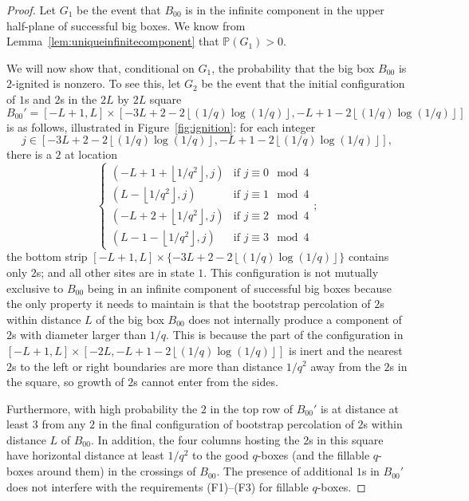 \documentclass{article}
\renewcommand{\P}{\mathbb{P}}
\newcommand{\floor}[1]{\left\lfloor#1\right \rfloor}
\numberwithin{equation}{section}
\begin{document}
\begin{proof} Let $G_1$ be the event that $B_{00}$ is in the infinite component in the upper half-plane of successful big boxes. We know from Lemma~\ref{lem:uniqueinfinitecomponent} that 
$\P(G_1) > 0$. 

We will now show that, conditional on $G_1$, the 
probability that the big box $B_{00}$ is $2$-ignited is nonzero. 
To see this, let $G_2$ be the event that the initial configuration of $1$s and $2$s in the $2L$ by $2L$ square 
\[
B_{00}'=[-L+1,L]\times [-3L+2-2\floor{(1/q)\log(1/q)}, -L+1-2\floor{(1/q)\log(1/q)}]
\]
is as follows, illustrated in Figure~\ref{fig:ignition}: 
for each integer
$$j \in [-3L+2-2\floor{(1/q)\log(1/q)}, -L+1-2\floor{(1/q)\log(1/q)}],$$ 
there is a $2$ at location
\[
\begin{cases}
    (-L+1+\floor{1/q^2},j) & \text{if } j \equiv 0 \mod 4 \\
    (L- \floor{1/q^2},j)   & \text{if } j \equiv 1 \mod 4 \\
    (-L+2+\floor{1/q^2},j) & \text{if } j \equiv 2 \mod 4 \\
    (L- 1 - \floor{1/q^2},j)   & \text{if } j \equiv 3 \mod 4
\end{cases};
\]
the bottom strip $[-L+1,L]\times \{-3L+2-2\floor{(1/q)\log(1/q)}\}$ contains only $2$s; and all other sites are in state $1$. 
This configuration is not mutually exclusive to $B_{00}$ being in an infinite component of successful big boxes because the only property it needs to maintain is that the bootstrap percolation of $2$s within distance $L$ of the big box $B_{00}$ does not internally produce a component of $2$s with diameter larger than $1/q$. 
This is because the part of the configuration in $[-L+1,L]\times [-2L,-L+1-2\floor{(1/q)\log(1/q)}]$ is inert and the nearest $2$s to the left or right boundaries are more than distance $1/q^2$ away from the $2$s in the square, so growth of $2$s cannot enter from the sides.

Furthermore, with high probability the $2$ in the top row of $B_{00}'$
is at distance at least 3 from any $2$ in the final configuration of 
bootstrap percolation of $2$s within distance $L$ of $B_{00}$. 
In addition, the four columns hosting the $2$s in this square have horizontal distance at least $1/q^2$ to the good $q$-boxes (and the fillable $q$-boxes around them) in the crossings of $B_{00}$. The presence of additional $1$s in $B_{00}'$ does not interfere with the requirements (F1)--(F3) for fillable $q$-boxes.  

 

\end{proof}
\end{document}
